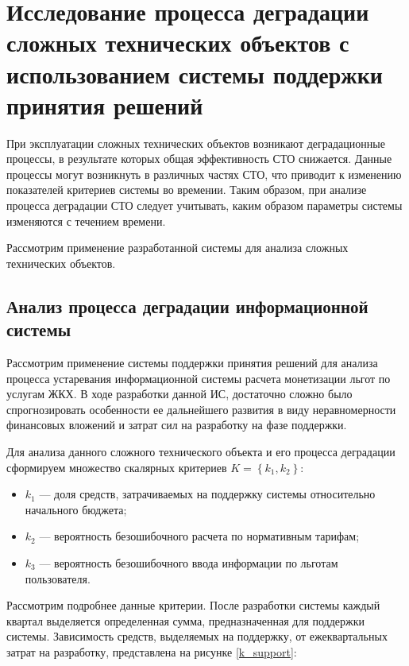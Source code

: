 \section{Исследование процесса деградации сложных технических объектов с использованием системы поддержки принятия решений}

При эксплуатации сложных технических объектов возникают деградационные процессы,
в результате которых общая эффективность СТО снижается.
Данные процессы могут возникнуть в различных частях СТО, что приводит к изменению показателей критериев системы во времении.
Таким образом, при анализе процесса деградации СТО следует учитывать, каким образом параметры системы изменяются с течением времени.

Рассмотрим применение разработанной системы для анализа сложных технических объектов.

\subsection{Анализ процесса деградации информационной системы}
Рассмотрим применение системы поддержки принятия решений для анализа процесса устаревания информационной системы расчета монетизации льгот по услугам ЖКХ.
В ходе разработки данной ИС, достаточно сложно было спрогнозировать особенности ее дальнейшего развития в виду 
неравномерности финансовых вложений и затрат сил на разработку на фазе поддержки.

Для анализа данного сложного технического объекта и его процесса деградации сформируем множество скалярных критериев $K=\left\{k_1,k_2\right\}$:
\begin{itemize}
    \item $k_1$ --- доля средств, затрачиваемых на поддержку системы относительно начального бюджета;
    \item $k_2$ --- вероятность безошибочного расчета по нормативным тарифам;
    \item $k_3$ --- вероятность безошибочного ввода информации по льготам пользователя.
\end{itemize}

Рассмотрим подробнее данные критерии.
После разработки системы каждый квартал выделяется определенная сумма, предназначенная для поддержки системы.
Зависимость средств, выделяемых на поддержку, от ежеквартальных затрат на разработку, представлена на рисунке \ref{k_support}:


